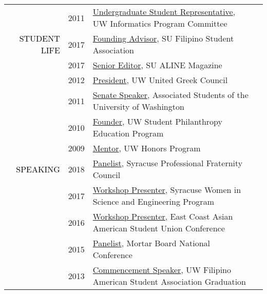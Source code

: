 \documentclass[12pt]{article}
\begin{document}
{{\begin{longtable}{Rp{1.0in}p{0.25in}p{4.75in}}
& \footnotesize{2011} & \href{https://ischool.uw.edu/about/leadership}{{Undergraduate Student Representative}}, UW Informatics Program Committee \\

\textcolor{black}{\footnotesize{\uppercase{Student Life}}} & \footnotesize{2017} & 
 \href{https://www.facebook.com/syracusefsa/}{{Founding Advisor}}, SU Filipino Student Association \\

& \footnotesize{2017} & \href{https://issuu.com/alinemagazine}{{Senior Editor}}, SU ALINE Magazine \\

& \footnotesize{2012} & \href{http://www.dailyuw.com/news/article_3c781595-0b4d-52be-9a6e-b2c956ae72eb.html}{{President}}, UW United Greek Council \\

& \footnotesize{2011} & \href{http://www.dailyuw.com/news/article_da48b049-d2a0-582c-9dfb-4589755ff1e5.html}{{Senate Speaker}}, Associated Students of the University of Washington \\

& \footnotesize{2010} & \href{https://www.washington.edu/giving/get-involved/for-students/real-dawgs-give-back/}{{Founder}}, UW Student Philanthropy Education Program \\

& \footnotesize{2009} & \href{http://depts.washington.edu/uwhonors/community/grads/12\_13/\#bdosono}{{Mentor}}, UW Honors Program \\

\textcolor{black}{\footnotesize{\uppercase{Speaking}}} & \footnotesize{2018} & \href{https://www.facebook.com/events/170505843576915/}{{Panelist}}, Syracuse Professional Fraternity Council \\

& \footnotesize{2017} & \href{http://www.suwise.syr.edu/}{{Workshop Presenter}}, Syracuse Women in Science and Engineering Program \\

& \footnotesize{2016} & \href{http://www.ecaasu.org/}{{Workshop Presenter}}, East Coast Asian American Student Union Conference \\

& \footnotesize{2015} & \href{http://www.mortarboard.org/conference/}{{Panelist}}, Mortar Board National Conference \\

& \footnotesize{2013} & \href{http://youtu.be/uz1tukrR-7E}{{Commencement Speaker}}, UW Filipino American Student Association Graduation \\


\end{longtable}}}
\end{document}
